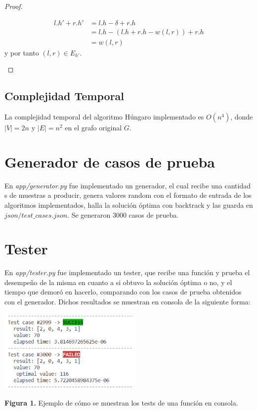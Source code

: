 \documentclass[10pt]{article} %
\begin{document}
\begin{proof}
\begin{enumerate}
			\begin{align*}
				l.h' + r.h' &= l.h - \delta + r.h\\
				&= l.h - (l.h + r.h -w(l,r)) + r.h\\
				&= w(l,r)			
			\end{align*}
			y por tanto $(l,r) \in E_{h'}$. 
			
			
		\end{enumerate}
		
	\end{proof}
	
	
	\subsection{Complejidad Temporal}
	
	La complejidad temporal del algoritmo H\'ungaro implementado es $O(n^4)$, donde $|V|=2n$ y $|E|=n^2$ en el grafo original $G$.
	
	\section{Generador de casos de prueba}
	
	En \textit{app/generator.py} fue implementado un generador, el cual recibe una cantidad s de muestras a producir, genera valores random con el formato de entrada de los algoritmos implementados, halla la soluci\'on \'optima con backtrack y las guarda en $ json/test\_cases.json $. Se generaron 3000 casos de prueba.
	
	\section{Tester}
	 En \textit{app/tester.py} fue implementado un tester, que recibe una funci\'on y prueba el desempe\~no de la misma en cuanto a si obtuvo la soluci\'on \'optima o no, y el tiempo que demor\'o en hacerlo, comparando con los casos de prueba obtenidos con el generador. Dichos resultados se muestran en consola de la siguiente forma:
	 	 \begin{center}
	 		\includegraphics[width=7cm]{tester_sample.png}
	 		
	 		\tiny{\textbf{Figura 1.} Ejemplo de c\'omo se muestran los tests de una funci\'on en consola.} 
	 	\end{center}
 	 
\end{document}
